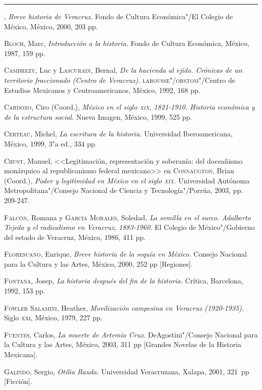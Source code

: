 \documentclass[14pt,twoside,final]{extbook} %
\begin{document}
\rule{1cm}{0.4pt}, \emph{Breve historia de Veracruz.} Fondo de Cultura Económica"/El Colegio de México, México, 2000, 203 pp.

\textsc{Bloch}, Marc, \emph{Introducción a la historia.} Fondo de Cultura Económica, México, 1987, 159 pp. \enlargethispage{\baselineskip}

\textsc{Cambrezy}, Luc y \textsc{Lascurain}, Bernal, \emph{De la hacienda al ejido. Crónicas de un territorio fraccionado (Centro de Veracruz).} \textsc{larousse"/orstom}"/Centro de Estudios Mexicanos y Centroamericanos, México, 1992, 168 pp.

\textsc{Cardozo}, Ciro (Coord.), \emph{México en el siglo \textsc{xix}, 1821-1910. Historia económica y de la estructura social.} Nueva Imagen, México, 1999, 525 pp.

\textsc{Certeau}, Michel, \emph{La escritura de la historia.} Universidad Iberoamericana, México, 1999, 3"a ed., 334 pp.

\textsc{Chust}, Manuel, <<Legitimación, representación y soberanía: del doceañismo
monárquico al republicanismo federal mexicano>> en \textsc{Connaugton}, Brian (Coord.), \emph{Poder y legitimidad en México en el siglo \textsc{xix}.} Universidad Autónoma Metropolitana"/Consejo Nacional de Ciencia y Tecnología"/Porrúa, 2003, pp. 209-247.

\textsc{Falcón}, Romana y \textsc{García Morales}, Soledad, \emph{La semilla en el surco. Adalberto Tejeda y el radicalismo en Veracruz, 1883-1960.} El Colegio de México"/Gobierno del
estado de Veracruz, México, 1986, 411 pp.

\textsc{Florescano}, Enrique, \emph{Breve historia de la sequía en México.} Consejo Nacional para la Cultura y las Artes, México, 2000, 252 pp [Regiones].

\textsc{Fontana}, Josep, \emph{La historia después del fin de la historia.} Crítica, Barcelona, 1992, 153 pp.

\textsc{Fowler Salamini}, Heather, \emph{Movilización campesina en Veracruz (1920-1935).} Siglo \textsc{xxi}, México, 1979, 227 pp.

\textsc{Fuentes}, Carlos, \emph{La muerte de Artemio Cruz.} DeAgostini"/Consejo Nacional para la Cultura y las Artes, México, 2003, 311 pp [Grandes Novelas de la Historia Mexicana].

\textsc{Galindo}, Sergio, \emph{Otilia Rauda.} Universidad Veracruzana, Xalapa, 2001, 321~pp [Ficción].
\end{document}

